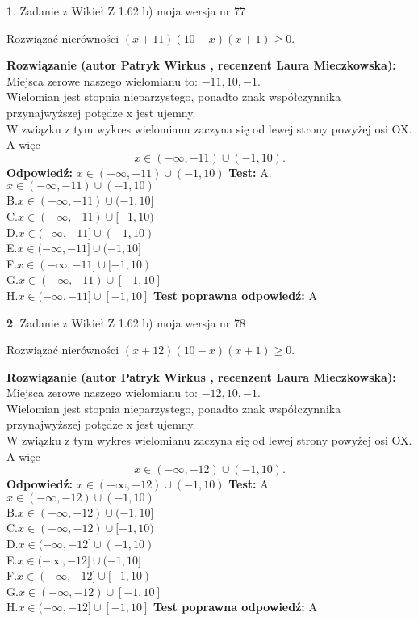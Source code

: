 \documentclass[12pt, a4paper]{article}
\theoremstyle{definition} %
\newtheorem{zad}{}
\newcommand{\zadStart}[1]{\begin{zad}#1\newline}
\newcommand{\zadStop}{\end{zad}}
\newcommand{\rozwStart}[2]{\noindent \textbf{Rozwiązanie (autor #1 , recenzent #2): }\newline}
\newcommand{\rozwStop}{\newline}
\newcommand{\odpStart}{\noindent \textbf{Odpowiedź:}\newline}
\newcommand{\odpStop}{\newline}
\newcommand{\testStart}{\noindent \textbf{Test:}\newline}
\newcommand{\testStop}{\newline}
\newcommand{\kluczStart}{\noindent \textbf{Test poprawna odpowiedź:}\newline}
\newcommand{\kluczStop}{\newline}
\begin{document}
\zadStart{Zadanie z Wikieł Z 1.62 b) moja wersja nr 77}

Rozwiązać nierówności $(x+11)(10-x)(x+1)\ge0$.
\zadStop
\rozwStart{Patryk Wirkus}{Laura Mieczkowska}
Miejsca zerowe naszego wielomianu to: $-11, 10, -1$.\\
Wielomian jest stopnia nieparzystego, ponadto znak współczynnika przy\linebreak najwyższej potędze x jest ujemny.\\ W związku z tym wykres wielomianu zaczyna się od lewej strony powyżej osi OX. A więc $$x \in (-\infty,-11) \cup (-1,10).$$
\rozwStop
\odpStart
$x \in (-\infty,-11) \cup (-1,10)$
\odpStop
\testStart
A.$x \in (-\infty,-11) \cup (-1,10)$\\
B.$x \in (-\infty,-11) \cup (-1,10]$\\
C.$x \in (-\infty,-11) \cup [-1,10)$\\
D.$x \in (-\infty,-11] \cup (-1,10)$\\
E.$x \in (-\infty,-11] \cup (-1,10]$\\
F.$x \in (-\infty,-11] \cup [-1,10)$\\
G.$x \in (-\infty,-11) \cup [-1,10]$\\
H.$x \in (-\infty,-11] \cup [-1,10]$
\testStop
\kluczStart
A
\kluczStop



\zadStart{Zadanie z Wikieł Z 1.62 b) moja wersja nr 78}

Rozwiązać nierówności $(x+12)(10-x)(x+1)\ge0$.
\zadStop
\rozwStart{Patryk Wirkus}{Laura Mieczkowska}
Miejsca zerowe naszego wielomianu to: $-12, 10, -1$.\\
Wielomian jest stopnia nieparzystego, ponadto znak współczynnika przy\linebreak najwyższej potędze x jest ujemny.\\ W związku z tym wykres wielomianu zaczyna się od lewej strony powyżej osi OX. A więc $$x \in (-\infty,-12) \cup (-1,10).$$
\rozwStop
\odpStart
$x \in (-\infty,-12) \cup (-1,10)$
\odpStop
\testStart
A.$x \in (-\infty,-12) \cup (-1,10)$\\
B.$x \in (-\infty,-12) \cup (-1,10]$\\
C.$x \in (-\infty,-12) \cup [-1,10)$\\
D.$x \in (-\infty,-12] \cup (-1,10)$\\
E.$x \in (-\infty,-12] \cup (-1,10]$\\
F.$x \in (-\infty,-12] \cup [-1,10)$\\
G.$x \in (-\infty,-12) \cup [-1,10]$\\
H.$x \in (-\infty,-12] \cup [-1,10]$
\testStop
\kluczStart
A
\kluczStop
\end{document}
